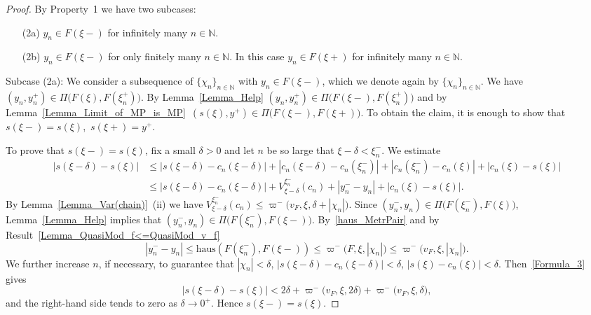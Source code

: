 \documentclass[final,3p,mathptmx]{article}%
\newcommand{\N}{{\mathbb N}}
\newcommand{\haus}{\mathrm{haus}}
\newcommand{\Pair}[2]{\Pi \big ( {#1},{#2} \big )}
\newcommand{\NewLeftLocalModul}[3]{\varpi^{-}\big( {#1},{#2},{#3} \big)}
\begin{document}
{{{\begin{proof}
	By Property~1 we have two subcases:
	\begin{itemize}
		\item[(2a)] $y_n \in  F(\xi-)$ for infinitely many $n \in \N${\color{magenta}.}
		\item[(2b)] $y_n \in  F(\xi-)$ for only finitely many  $n \in \N$. In this case
		$y_n \in  F(\xi+)$ for infinitely many $n \in \N${\color{magenta}.}
	\end{itemize}
	
	Subcase (2a): We consider a subsequence of   $\{\chi_n\}_{n \in \N}$ with $y_n \in  F(\xi-)$, which we denote again by $\{\chi_n\}_{n \in \N}$.
	We have $(y_n, y_n^+) \in \Pair{F(\xi)}{F(\xi_n^+)}$. By Lemma~\ref{Lemma_Help} ${(y_n, y_n^+) \in \Pair{F(\xi-)}{F(\xi_n^+)} }$ and by Lemma~\ref{Lemma_Limit_of_MP_is_MP}\, $(s(\xi), y^+) \in \Pair{F(\xi-)}{F(\xi+)}$. To obtain the claim, it is enough to show that $s(\xi-)=s(\xi)$,\ $s(\xi+)=y^+$.
	
	To prove that $s(\xi-)=s(\xi)$, fix a small $\delta >0$ and let $n$ be so large that $\xi - \delta < \xi_n^-$. We estimate
	\begin{equation}\label{Formula_3}
		\begin{split}
			|s(\xi-\delta)-s(\xi)| & \le
			|s(\xi-\delta)-c_n(\xi-\delta)|+|c_n(\xi-\delta)-c_n(\xi_n^-)| + |c_n(\xi_n^-)- c_n(\xi)|+ |c_n(\xi)-s(\xi)|\\&
			\le |s(\xi-\delta)-c_n(\xi-\delta)|+ V_{\xi-\delta}^{\xi_n^-}(c_n) +|y_n^- - y_n| + |c_n(\xi)-s(\xi)|.
		\end{split}
	\end{equation}
	By Lemma~\ref{Lemma_Var(chain)}~(ii) we have 
	$V_{\xi-\delta}^{\xi_n^-}(c_n) \le \NewLeftLocalModul{v_F}{\xi}{\delta + |\chi_n|}$. 
	Since $(y_n^-, y_n) \in \Pair{F(\xi_n^-)}{F(\xi)}$,  Lemma~\ref{Lemma_Help} implies that $(y_n^-, y_n) \in \Pair{F(\xi_n^-)}{F(\xi-)}$.
	By~\eqref{haus_MetrPair} and by Result~\ref{Lemma_QuasiMod_f<=QuasiMod_v_f}
	$$
	|y_n^- - y_n| \le \haus (F(\xi_n^-), F(\xi-)) \le \NewLeftLocalModul{F}{\xi}{|\chi_n|} 
	\le \NewLeftLocalModul{v_F}{\xi}{|\chi_n|}.
	$$
	We further increase $n$, if necessary, to guarantee that $|\chi_n|<\delta$, $|s(\xi-\delta)-c_n(\xi-\delta)| < \delta$, $|s(\xi)-c_n(\xi)| < \delta$. 
	Then~\eqref{Formula_3} gives
	$$ 
	|s(\xi-\delta)-s(\xi)| < 2\delta + \NewLeftLocalModul{v_F}{\xi}{2\delta} + \NewLeftLocalModul{v_F}{\xi}{\delta},
	$$
	and the right-hand side tends to zero as $\delta \to 0^+$. Hence $s(\xi-)=s(\xi)$. 
	

\end{proof}}}}
\end{document}
